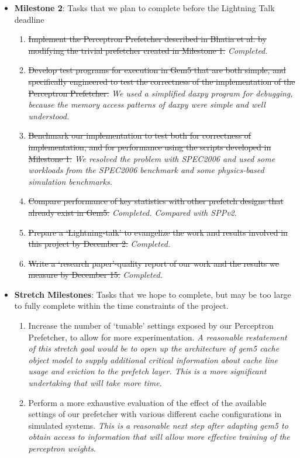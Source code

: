 \documentclass[10pt,conference]{IEEEtran}
\begin{document}
\begin{itemize}
\begin{enumerate}
  \end{enumerate}
\item\textbf{Milestone 2}: Tasks that we plan to complete before the Lightning Talk deadline
  \begin{enumerate}
      \item  \sout{Implement the Perceptron Prefetcher described in Bhatia et al. by modifying the trivial prefetcher created in Milestone 1.} \textit{Completed.}
      \item \sout{Develop test programs for execution in Gem5 that are both simple, and specifically engineered to test the correctness of the implementation of the Perceptron Prefetcher.} \textit{We used a simplified daxpy program for debugging, because the memory access patterns of daxpy were simple and well understood.}
      \item \sout{Benchmark our implementation to test both for correctness of implementation, and for performance using the scripts developed in Milestone 1.} \textit{We resolved the problem with SPEC2006 and used some workloads from the SPEC2006 benchmark and some physics-based simulation benchmarks.}
      \item \sout{Compare performance of key statistics with other prefetch designs that already exist in Gem5.} \textit{Completed. Compared with SPPv2}.
      \item \sout{Prepare a `Lightning-talk' to evangelize the work and results involved in this project by December 2.} \textit{Completed.}
      \item \sout{Write a `research paper'-quality report of our work and the results we measure by December 15.} \textit{Completed.}
  \end{enumerate} 
\item\textbf{Stretch Milestones}: Tasks that we hope to complete, but may be too large to fully complete within the time constraints of the project.
  \begin{enumerate}
      \item Increase the number of `tunable' settings exposed by our Perceptron Prefetcher, to allow for more experimentation. \textit{A reasonable restatement of this stretch goal would be to open up the architecture of gem5 cache object model to supply additional critical information about cache line usage and eviction to the prefetch layer. This is a more significant undertaking that will take more time.}
      \item Perform a more exhaustive evaluation of the effect of the available settings of our prefetcher with various different cache configurations in simulated systems. \textit{This is a reasonable next step after adapting gem5 to obtain access to information that will allow more effective training of the perceptron weights}.

\end{enumerate}
\end{itemize}
\end{document}
